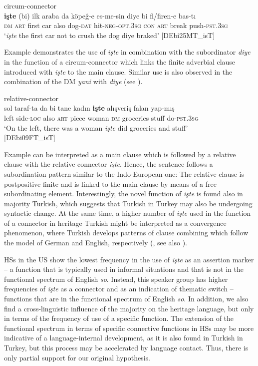 \documentclass[output=paper,colorlinks,citecolor=brown]{langscibook}
\begin{document}
\ea circum-connector\label{ex:labrenzetal:16}\\
\gll \textbf{işte} (bi) ilk araba da köpeğ-e es-me-sin diye bi fi/firen-e bas-tı \\ \textsc{dm} \textsc{art} first car also dog-\textsc{dat} hit-\textsc{neg}-\textsc{opt.3sg} \textsc{con} \textsc{art} break push-\textsc{pst.3sg}\\
\glt ‘\textit{işte} the first car not to crush the dog diye braked’ \hfill[DEbi25MT\_isT]
\z

\noindent Example  demonstrates the use of \textit{işte} in combination with the subordinator \textit{diye} in the function of a circum-connector which links the finite adverbial clause introduced with \textit{işte} to the main clause. Similar use is also observed in the combination of the DM \textit{yani} with \textit{diye} (see ).

\ea relative-connector\label{ex:labrenzetal:17}\\
\gll sol taraf-ta da bi tane kadın \textbf{işte} alışveriş falan yap-mış \\ left	side-\textsc{loc} also \textsc{art} piece woman \textsc{dm} groceries stuff do-\textsc{pst.3sg}\\
\glt ‘On the left, there was a woman \textit{işte} did groceries and stuff’ \\
\hfill[DEbi09FT\_isT]
\z

\noindent Example  can be interpreted as a main clause which is followed by a relative clause with the relative connector \textit{işte}. Hence, the sentence follows a subordination pattern similar to the Indo-European one: The relative clause is postpositive finite and is linked to the main clause by means of a free subordinating element. Interestingly, the novel function of \textit{işte} is found also in majority Turkish, which suggests that Turkish in Turkey may also be undergoing syntactic change. At the same time, a higher number of \textit{işte} used in the function of a connector in heritage Turkish might be interpreted as a convergence phenomenon, where Turkish develops patterns of clause combining which follow the model of German and English, respectively (\citealt{ozsoy_shifting_2022}, see also \cite{chapters/08}). 

HSs in the US show the lowest frequency in the use of \textit{işte} as an assertion marker – a function that is typically used in informal situations and that is not in the functional spectrum of English \textit{so}. Instead, this speaker group has higher frequencies of \textit{işte} as a connector and as an indication of thematic switch – functions that are in the functional spectrum of English \textit{so}. In addition, we also find a cross-linguistic influence of the majority on the heritage language, but only in terms of the frequency of use of a specific function. The extension of the functional spectrum in terms of specific connective functions in HSs may be more indicative of a language-internal development, as it is also found in Turkish in Turkey, but this process may be accelerated by language contact. Thus, there is only partial support for our original hypothesis.
\end{document}
